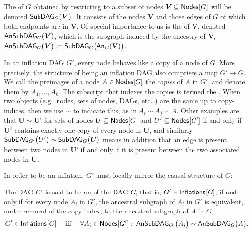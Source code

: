 The  of $G$ obtained by restricting to a subset of nodes $\bm{V}\subseteq \SmallNamedFunction{Nodes}{G}$ will be denoted $\subgraph[G]{\bm{V}}$.
It consists of the nodes $\bm{V}$ and those edges of $G$ of which both endpoints are in $\bm{V}$. Of special importance to us is the 
 of $\bm{V}$, denoted $\ansubgraph[G]{\bm{V}}$, which is the subgraph induced by the ancestry of $\bm{V}$, $\ansubgraph[G]{\bm{V}}\coloneqq\subgraph[G]{\An[G]{\bm{V}}}$. 

In an inflation DAG $G'$, every node behaves like a copy of a node of $G$. More precisely, the structure of being an inflation DAG also comprises a map $G'\to G$. We call the preimages of a node $A\in\nodes{G}$ the \emph{copies} of $A$ in $G'$, and denote them by $A_1,\ldots, A_k$. The subscript that indexes the copies is termed the .  When two objects (e.g.~nodes, sets of nodes, DAGs, etc\ldots) are the same up to copy-indices, then we use $\sim$ to indicate this, as in $A_i\sim A_j\sim A$. Other examples are that $\bm{U}\sim\bm{U'}$ for sets of nodes $\bm{U}\subseteq\nodes{G}$ and $\bm{U}'\subseteq\nodes{G'}$ if and only if $\bm{U'}$ contains exactly one copy of every node in $\bm{U}$, and similarly $\subgraph[G']{\bm{U}'}\sim\subgraph[G]{\bm{U}}$ means in addition that an edge is present between two nodes in $\bm{U}'$ if and only if it is present between the two associated nodes in $\bm{U}$.

In order to be an inflation, $G'$ must locally mirror the causal structure of $G$:
\begin{definition}
The DAG $G'$ is said to be an  of the DAG $G$, that is, $G' \in \SmallNamedFunction{Inflations}{G}$, if and only if  for every node $A_i$ in $G'$, the ancestral subgraph of $A_i$ in $G'$ is equivalent, under removal of the copy-index, to the ancestral subgraph of $A$ in $G$,
\begin{align}\label{eq:definflationDAG}
G' \in\SmallNamedFunction{Inflations}{G} \quad\text{ iff }\quad \forall A_i\in \SmallNamedFunction{Nodes}{G'}:\; \ansubgraph[G']{A_i}\sim\ansubgraph[G]{A}.
\end{align}
\end{definition}

